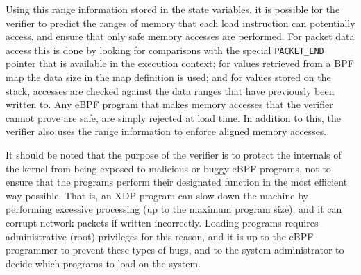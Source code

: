 \documentclass[sigconf]{acmart}
\begin{document}
Using this range information stored in the state variables, it is possible for
the verifier to predict the ranges of memory that each load instruction can
potentially access, and ensure that only safe memory accesses are performed. For
packet data access this is done by looking for comparisons with the special
\texttt{PACKET\_END} pointer that is available in the execution context; for
values retrieved from a BPF map the data size in the map definition is used; and
for values stored on the stack, accesses are checked against the data ranges
that have previously been written to. Any eBPF program that makes memory
accesses that the verifier cannot prove are safe, are simply rejected at load
time. In addition to this, the verifier also uses the range information to
enforce aligned memory accesses.

It should be noted that the purpose of the verifier is to protect the internals
of the kernel from being exposed to malicious or buggy eBPF programs, not to
ensure that the programs perform their designated function in the most efficient
way possible. That is, an XDP program can slow down the machine by performing
excessive processing (up to the maximum program size), and it can corrupt
network packets if written incorrectly. Loading programs requires administrative
(root) privileges for this reason, and it is up to the eBPF programmer to
prevent these types of bugs, and to the system administrator to decide which
programs to load on the system.
\end{document}
